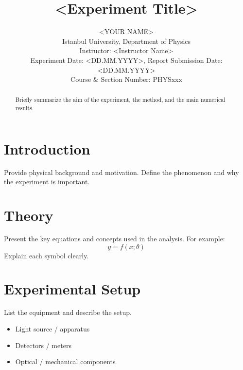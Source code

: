 \documentclass[journal]{IEEEtran}
\begin{document}
\title{<Experiment Title>}
\author{<YOUR NAME> \\
Istanbul University, Department of Physics \\
Instructor: <Instructor Name> \\
Experiment Date: <DD.MM.YYYY>, Report Submission Date: <DD.MM.YYYY>\\
Course \& Section Number: PHYSxxx}


\maketitle

\begin{abstract}
    Briefly summarize the aim of the experiment, the method, and the main numerical results.
\end{abstract}

\section{Introduction}
Provide physical background and motivation. Define the phenomenon and why the experiment is important.

\section{Theory}
Present the key equations and concepts used in the analysis.
For example:
\begin{equation}
    y = f(x; \theta)
\end{equation}
Explain each symbol clearly.

\section{Experimental Setup}
List the equipment and describe the setup.

\begin{itemize}
    \item Light source / apparatus
    \item Detectors / meters
    \item Optical / mechanical components
\end{itemize}
\end{document}
